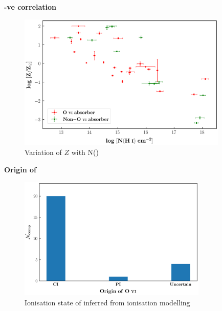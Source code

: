 \begin{frame}[noframenumbering]{\textbf{-ve correlation}}

    \begin{figure}[!htbp]
    \centering
    \vspace*{-2mm}
    \includegraphics[width=10cm,draft=False]{Figures-Thesis/Z_vs_NHi.png}
    \vspace*{-1mm}
    \caption{Variation of $Z$ with N()}
    \end{figure}  
    
    \end{frame}


\begin{frame}{\textbf{Origin of }}

\begin{figure}[!htbp]
    \centering
    \includegraphics[width=9cm]{Figures-Thesis/OVI_cases.png}
    \vspace*{-1mm}
    \caption{Ionisation state of  inferred from ionisation modelling}
\end{figure}  

\end{frame}



